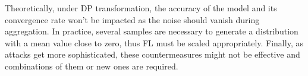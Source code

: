 Theoretically, under DP transformation, the accuracy of the model and its convergence rate won't be impacted as the noise should vanish during aggregation. In practice, several samples are necessary to generate a distribution with a mean value close to zero, thus FL must be scaled appropriately. Finally, as attacks get more sophisticated, these countermeasures might not be effective and combinations of them or new ones are required.


